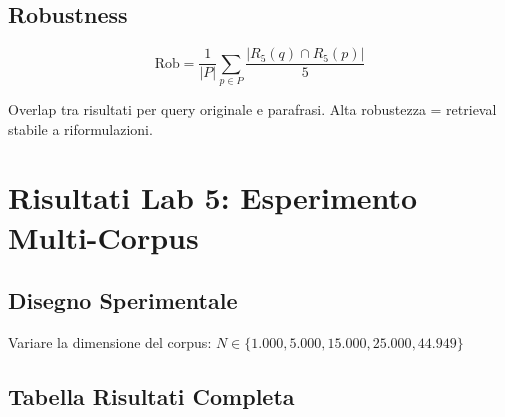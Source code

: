 \documentclass[12pt,a4paper]{article}
\begin{document}
\subsection{Robustness}

\begin{formulabox}
\[
\text{Rob} = \frac{1}{|P|} \sum_{p \in P} \frac{|R_5(q) \cap R_5(p)|}{5}
\]
\end{formulabox}
Overlap tra risultati per query originale e parafrasi. Alta robustezza = retrieval stabile a riformulazioni.

\section{Risultati Lab 5: Esperimento Multi-Corpus}

\subsection{Disegno Sperimentale}

Variare la dimensione del corpus: $N \in \{1.000, 5.000, 15.000, 25.000, 44.949\}$

\subsection{Tabella Risultati Completa}
\end{document}
